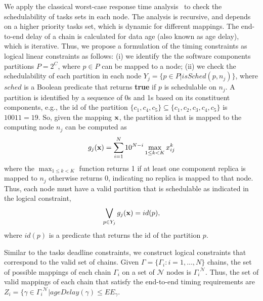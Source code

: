 We apply the classical worst-case response time analysis~\cite{Baruah2011Response-timeSystems} to check the schedulability of tasks sets in each node. The analysis is recursive, and depends on a higher priority tasks set, which is dynamic for different mappings. The end-to-end delay of a chain is calculated for data age (also known as age delay), which is iterative. Thus, we propose a formulation of the timing constraints as logical linear constraints as follows: (i) we identify the the software components partitions $P=2^C$, where $p\in P$ can be mapped to a node; (ii) we check the schedulability of each partition in each node $Y_j=\{p\in P| isSched(p,n_j)\}$, where $sched$ is a Boolean predicate that returns \textbf{true} if $p$ is schedulable on $n_j$.  A partition is identified by a sequence of 0s and 1s based on its constituent components, e.g., the id of the partition $\{c_1,c_4,c_5\}\subseteq \{c_1,c_2,c_3,c_4,c_5\}$ is $10011=19$. So, given the mapping $\textbf{x}$, the partition id that is mapped to the computing node $n_j$ can be computed as
\begin{align}
	g_j(\textbf{x})=\sum_{i=1}^{N}{10^{N-i}\max_{1\leq k< K}x^{k}_{ij}}
\end{align}
where the $\max_{1\leq k< K}$ function returns 1 if at least one component replica is mapped to $n_j$ otherwise returns 0, indicating no replica is mapped to that node. Thus, each node must have a valid partition that is schedulable as indicated in the logical constraint,
\begin{align}
\bigvee\limits_{p\in Y_j}g_j (\textbf{x})= id(p) ,
\end{align}
where $id(p)$ is a predicate that returns the id of the partition $p$.

Similar to the tasks deadline constraints, we construct logical constraints that correspond to the valid set of chains. Given $\Gamma =\{\Gamma_i:i=1,...,N\}$ chains, the set of possible mappings of each chain $\Gamma_i$ on a set of $\mathcal{N}$ nodes is ${\Gamma_i}^\mathcal{N}$. Thus, the set of valid mappings of each chain that satisfy the end-to-end timing requirements are $Z_i=\{\gamma\in {\Gamma_i}^\mathcal{N}| ageDelay(\gamma) \leq {EE}_\gamma$.

